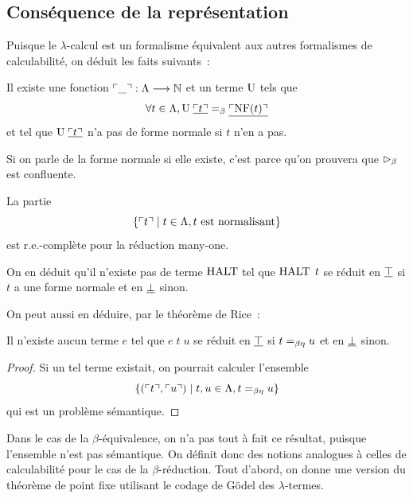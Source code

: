 \subsection{Conséquence de la représentation}

Puisque le $\lambda$-calcul est un formalisme équivalent aux autres formalismes
de calculabilité, on déduit les faits suivants~:

\begin{proposition}
  Il existe une fonction $\ulcorner\mathord{\_}\urcorner : \displaystyle \Lambda \longrightarrow \mathbb N$ et un terme
  $\mathrm{U}$ tels que
  \[\forall t \in \Lambda, \mathrm{U}\;\underline{\ulcorner t\urcorner}
  =_{\beta} \underline{\ulcorner\operatorname{NF}(t)\urcorner}\]
  et tel que $\mathrm{U}\;\underline{\ulcorner t\urcorner}$ n'a pas de forme normale si $t$ n'en a
  pas.
\end{proposition}

\begin{remark}
  Si on parle de \og la\fg{} forme normale si elle existe, c'est parce qu'on
  prouvera que $\mathrel{\rhd_{\beta}}$ est confluente.
\end{remark}

\begin{proposition}
  La partie
  \[\left\{ \ulcorner t\urcorner \;\middle\vert\; t \in \Lambda, t\text{ est normalisant} \right\}\]
  est r.e.-complète pour la réduction many-one.
\end{proposition}

On en déduit qu'il n'existe pas de terme $\operatorname{HALT}$ tel que $\operatorname{HALT}\;t$ se réduit
en $\underline{\top}$ si $t$ a une forme normale et en $\underline{\bot}$ sinon.

On peut aussi en déduire, par le théorème de Rice~:

\begin{proposition}
  Il n'existe aucun terme $e$ tel que $e\;t\;u$ se réduit en $\underline{\top}$ si
  $t =_{\beta\eta} u$ et en $\underline{\bot}$ sinon.
\end{proposition}

\begin{proof}
  Si un tel terme existait, on pourrait calculer l'ensemble
  \[\left\{ (\ulcorner t\urcorner,\ulcorner u\urcorner) \;\middle\vert\; t, u \in \Lambda, t =_{\beta\eta} u \right\}\]
  qui est un problème sémantique.
\end{proof}

Dans le cas de la $\beta$-équivalence, on n'a pas tout à fait ce résultat,
puisque l'ensemble n'est pas sémantique. On définit donc des notions analogues à
celles de calculabilité pour le cas de la $\beta$-réduction. Tout d'abord,
on donne une version du théorème de point fixe utilisant le codage de Gödel des
$\lambda$-termes.

